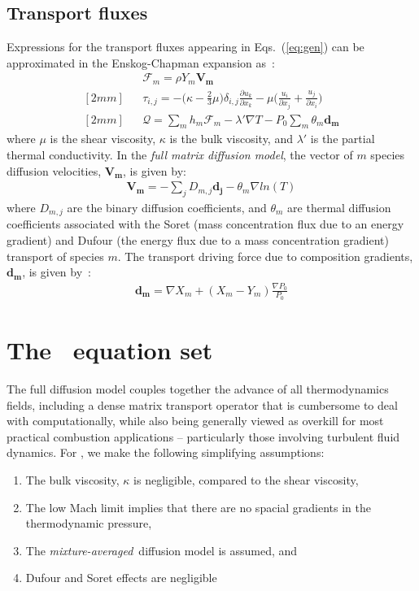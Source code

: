 \subsection{Transport fluxes}
\label{sub:DifFluxes}
Expressions for the transport fluxes appearing in Eqs.~(\ref{eq:gen}) can be approximated in the Enskog-Chapman expansion as~\cite{Ern:1994multicomponent}:
 \begin{eqnarray*}
&&\boldsymbol{\mathcal{F}}_{m} = \rho Y_m \boldsymbol{V_m}
\\ [2mm]
&&\tau_{i,j} = - \Big(\kappa - \frac{2}{3} \mu \Big) \delta_{i,j} \frac{\partial {u_k}}{\partial x_k} - \mu \Big(\frac{u_i}{\partial x_j} + \frac{u_j}{\partial x_i}\Big)
\\ [2mm]
&&\boldsymbol{\mathcal{Q}} =  \sum_m h_m \boldsymbol{\mathcal{F}}_{m}  - \lambda' \nabla T - P_0 \sum_m \theta_m \boldsymbol{d_m}
\end{eqnarray*}
where $\mu$ is the shear viscosity, $\kappa$ is the bulk viscosity, and $\lambda'$ is the partial thermal conductivity. In the \textit{full matrix diffusion model}, the vector of $m$ species diffusion velocities, $\boldsymbol{V_m}$, is given by:
 \begin{eqnarray*}
\boldsymbol{V_m} = - \sum_j  {D}_{m,j} \boldsymbol{d_j} - \theta_m \nabla ln(T)
\end{eqnarray*}
where ${D}_{m,j}$ are the binary diffusion coefficients, and $\theta_m$ are thermal diffusion coefficients associated with the Soret (mass concentration flux due to an energy gradient) and Dufour (the energy flux due to a mass concentration gradient) transport of species $m$. The transport driving force due to composition gradients, $\boldsymbol{d_m}$, is given by~\cite{Ern:1994multicomponent}:
 \begin{eqnarray*}
\boldsymbol{d_m} = \nabla X_m + (X_m -Y_m) \frac{\nabla P_0}{P_0}
\label{dmeqs}
\end{eqnarray*}

\section{The \pelelm\ equation set}
\label{SumUpEq}
The full diffusion model couples together the advance of all thermodynamics fields, including a dense matrix transport operator that is cumbersome to deal with computationally, while also being generally viewed as overkill for most practical combustion applications -- particularly those involving turbulent fluid dynamics.  For \pelelm, we make the following simplifying assumptions:
\begin{enumerate}
\item The bulk viscosity, $\kappa$ is negligible, compared to the shear viscosity,
\item The low Mach limit implies that there are no spacial gradients in the thermodynamic pressure,
\item The \textit{mixture-averaged}\ diffusion model is assumed, and
\item Dufour and Soret effects are negligible
\end{enumerate}

